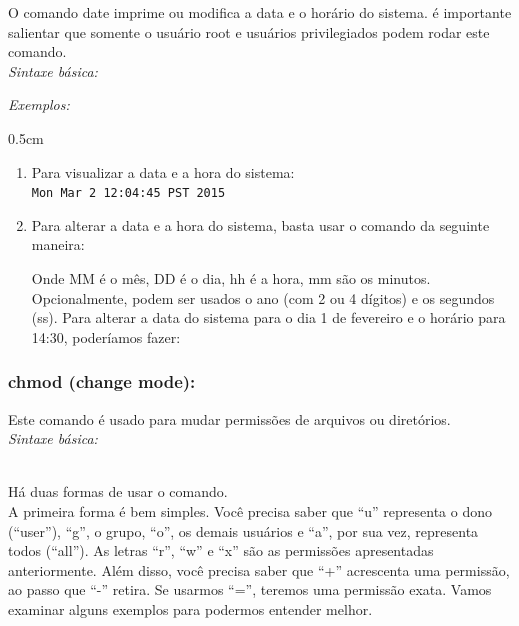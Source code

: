 \begin{refsection}
 O comando date imprime ou modifica a data e o horário do sistema. é importante salientar que somente o usuário root e usuários privilegiados podem rodar este comando.\\

\textit{Sintaxe básica:}


\textit{Exemplos:}
\begin {myindentpar}{0.5cm}
\begin{enumerate}[\itshape i.]

\item{Para visualizar a data e a hora do sistema:}
 \\
 \texttt{Mon Mar  2 12:04:45 PST 2015}\\

\item{Para alterar a data e a hora do sistema, basta usar o comando da seguinte maneira:}


 Onde MM é o mês, DD é o dia, hh é a hora, mm são os minutos. Opcionalmente, podem ser usados o ano (com 2 ou 4 dígitos) e os segundos (ss). Para alterar a data do sistema para o dia 1 de fevereiro e o horário para 14:30, poderíamos fazer:


\end{enumerate}
\end{myindentpar}

\subsubsection{chmod (change mode):}\label{tut1:text_mode:commands:chmod}

 Este comando é usado para mudar permissões de arquivos ou diretórios.\\

\textit{Sintaxe básica:}

\\

Há duas formas de usar o comando.\\
A primeira forma é bem simples. Você precisa saber que ``u'' representa o dono (``user''), ``g'', o grupo, ``o'', os demais usuários e ``a'', por sua vez, representa todos (``all''). As letras ``r'', ``w'' e ``x'' são as permissões apresentadas anteriormente. Além disso, você precisa saber que ``+'' acrescenta uma permissão, ao passo que ``-'' retira. Se usarmos ``='', teremos uma permissão exata. Vamos examinar alguns exemplos para podermos entender melhor.\\


\end{refsection}
